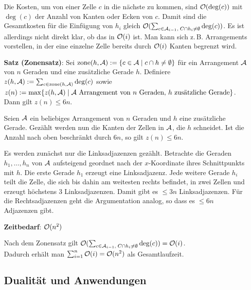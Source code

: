 Die Kosten, um von einer Zelle $c$ in die nächste zu kommen, sind $\mathcal{O}(\deg(c))$ mit
$\deg(c)$ der Anzahl von Kanten oder Ecken von $c$.
Damit sind die Gesamtkosten für die Einfügung von $h_i$ gleich
$\mathcal{O}(\sum_{c \in \mathcal{A}_{i-1},\; C \cap h_i \not= \emptyset} \deg(c))$.
Es ist allerdings nicht direkt klar, ob das in $\mathcal{O}(i)$ ist.
Man kann sich z.\,B. Arrangements vorstellen, in der eine einzelne Zelle bereits durch $\mathcal{O}(i)$
Kanten begrenzt wird.

\linie

\textbf{Satz (Zonensatz)}:
Sei $\operatorname{zone}(h, \mathcal{A}) := \{c \in \mathcal{A} \;|\; c \cap h \not= \emptyset\}$
für ein Arrangement $\mathcal{A}$ von $n$ Geraden und eine zusätzliche Gerade $h$.
Definiere $z(h, \mathcal{A}) := \sum_{c \in \operatorname{zone}(h, \mathcal{A})} \deg(c)$ sowie\\
$z(n) := \max\{z(h, \mathcal{A}) \;|\; \text{$\mathcal{A}$ Arrangement von $n$ Geraden, $h$ zusätzliche Gerade}\}$.\\
Dann gilt $z(n) \le 6n$.

\begin{Beweis}
    Seien $\mathcal{A}$ ein beliebiges Arrangement von $n$ Geraden und $h$ eine zusätzliche Gerade.
    Gezählt werden nun die Kanten der Zellen in $\mathcal{A}$, die $h$ schneidet.
    Ist die Anzahl nach oben beschränkt durch $6n$, so gilt $z(n) \le 6n$.

    Es werden zunächst nur die Linksadjazenzen gezählt.
    Betrachte die Geraden $h_1, \dotsc, h_n$ von $\mathcal{A}$ aufsteigend geordnet nach der $x$-Koordinate
    ihres Schnittpunkts mit $h$.
    Die erste Gerade $h_1$ erzeugt eine Linksadjazenz.
    Jede weitere Gerade $h_i$ teilt die Zelle, die sich bis dahin am weitesten rechts befindet,
    in zwei Zellen und erzeugt höchstens $3$ Linksadjazenzen.
    Damit gibt es $\le 3n$ Linksadjazenzen.
    Für die Rechtsadjazenzen geht die Argumentation analog, so dass es
    $\le 6n$ Adjazenzen gibt.
\end{Beweis}

\linie

\textbf{Zeitbedarf}:
$\mathcal{O}(n^2)$

\begin{Beweis}
    Nach dem Zonensatz gilt
    $\mathcal{O}(\sum_{c \in \mathcal{A}_{i-1},\; C \cap h_i \not= \emptyset} \deg(c)) = \mathcal{O}(i)$.\\
    Dadurch erhält man $\sum_{i=1}^n \mathcal{O}(i) = \mathcal{O}(n^2)$ als Gesamtlaufzeit.
\end{Beweis}

\pagebreak

\subsection{%
    Dualität und Anwendungen%
}

